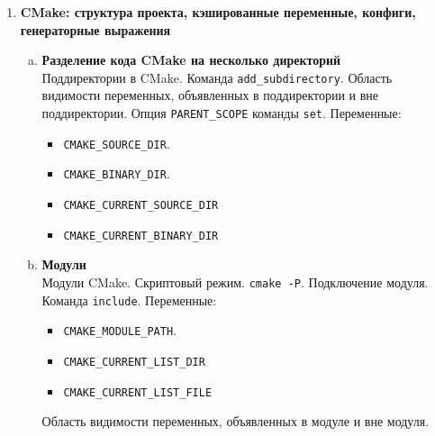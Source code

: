 \documentclass{article}
\begin{document}
\begin{enumerate}
\begin{enumerate}[a.]
\item \textbf{Работа с файлами в CMake. Команда \texttt{file} и её опции.}
\begin{multicols}{3}
\begin{itemize}
\item \texttt{READ}
\item \texttt{STRINGS}
\item \texttt{WRITE}
\item \texttt{APPEND}
\item \texttt{GLOB}
\item \texttt{MAKE\_DIRECTORY}
\item \texttt{COPY\_FILE}
\item \texttt{SIZE}
\item \texttt{DOWNLOAD}

\end{itemize}
\end{multicols}

\end{enumerate}





\newpage
\item \textbf{CMake: структура проекта, кэшированные переменные, конфиги, генераторные выражения}
\begin{enumerate}[a.]
\item \textbf{Разделение кода CMake на несколько директорий}\\
Поддиректории в CMake. Команда \texttt{add\_subdirectory}. 
Область видимости переменных, объявленных в поддиректории и вне поддиректории. Опция \texttt{PARENT\_SCOPE} команды \texttt{set}. Переменные:
\begin{itemize}
\item \texttt{CMAKE\_SOURCE\_DIR}.
\item \texttt{CMAKE\_BINARY\_DIR}.
\item \texttt{CMAKE\_CURRENT\_SOURCE\_DIR}
\item \texttt{CMAKE\_CURRENT\_BINARY\_DIR}
\end{itemize}

\item \textbf{Модули}\\
Модули CMake. Скриптовый режим. \texttt{cmake -P}. Подключение модуля. Команда \texttt{include}. Переменные:
\begin{itemize}
\item \texttt{CMAKE\_MODULE\_PATH}.
\item \texttt{CMAKE\_CURRENT\_LIST\_DIR}
\item \texttt{CMAKE\_CURRENT\_LIST\_FILE}
\end{itemize}
Область видимости переменных, объявленных в модуле и вне модуля.



\end{enumerate}
\end{enumerate}
\end{document}
